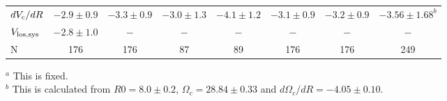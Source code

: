 \documentclass[11pt,a4paper]{article}
\begin{document}
\begin{landscape}
\begin{table}
\begin{tabular}{lccccccc }
 $dV_{\rm c}/dR$     & $ -2.9\pm   0.9$    & $ -3.3\pm   0.9$   & $ -3.0\pm   1.3$ & $ -4.1\pm   1.2$ & $ -3.1\pm   0.9$ 
   & $ -3.2\pm   0.9$ & $-3.56\pm1.68^{b}$ \\

 $V_{\rm los,sys}$            & $ -2.8\pm   1.0$    & $-$                       &  $-$                       &  $-$                   &   $-$  
   &  $-$ &  $-$ \\ 

 N                                      & 176                       & 176                     &  87                         & 89  & 176
  & 176 &  249 \\
 
\hline
\end{tabular}

$^{a}$ This is fixed.\\
$^{b}$ This is calculated from $R0=8.0\pm0.2$, $\Omega_c=28.84\pm0.33$ and $d\Omega_c/dR=-4.05\pm0.10$.
\end{table}
\end{landscape}
\end{document}

